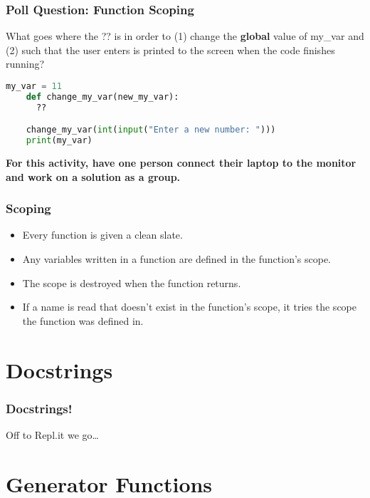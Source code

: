 \documentclass{beamer}
\begin{document}
%
%
%
\begin{frame}[fragile]
  \frametitle{Poll Question: Function Scoping}
  What goes where the ?? is in order to (1) change the \textbf{global} value of my\_var and (2) such that the user enters is printed to the screen when the code finishes running?
  \begin{lstlisting}[language=Python, autogobble]
    my_var = 11
    def change_my_var(new_my_var):
      ??

    change_my_var(int(input("Enter a new number: ")))
    print(my_var)
  \end{lstlisting}
  \vfill
  \textbf{For this activity, have one person connect their laptop to the monitor and work on a solution as a group.}
\end{frame}

%
%
\begin{frame}[fragile]
  \frametitle{Scoping}
  \begin{itemize}
    \item Every function is given a clean slate.
    \item Any variables written in a function are defined in the function's scope.
    \item The scope is destroyed when the function returns.
    \item If a name is read that doesn't exist in the function's scope, it tries the scope the function was defined in.
  \end{itemize}
\end{frame}

\section{Docstrings}
%
%
\begin{frame}[fragile]
  \frametitle{Docstrings!}
  \centering
  Off to Repl.it we go\ldots
\end{frame}

\section{Generator Functions}
\end{document}
